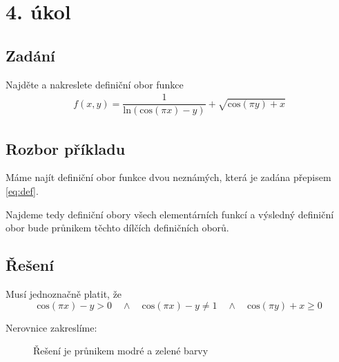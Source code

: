 \section{4. úkol}
\subsection*{Zadání}
Najděte a nakreslete definiční obor funkce 
\begin{eqnarray}f(x,y) = \dfrac{1}{\mathrm{ln}(\mathrm{cos}(\pi x) - y)} + \sqrt{\mathrm{cos}(\pi y) + x}
\label{eq:def}
\end{eqnarray}
\subsection*{Rozbor příkladu}
Máme najít definiční obor funkce dvou neznámých, která je zadána přepisem \ref{eq:def}. 

Najdeme tedy definiční obory všech elementárních funkcí a výsledný definiční obor bude průnikem těchto dílčích definičních oborů.

\subsection*{Řešení}
Musí jednoznačně platit, že
\begin{displaymath}
\mbox{cos}(\pi x) - y  > 0 \quad \wedge \quad \mbox{cos}(\pi x) - y \neq 1 \quad \wedge \quad \mbox{cos}(\pi y) + x \geq 0
\end{displaymath}

\noindent Nerovnice zakreslíme:

\begin{figure}[H]
	\centering
	
	\caption{Řešení je průnikem modré a zelené barvy}
\end{figure}
